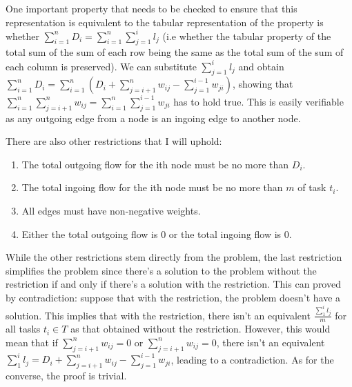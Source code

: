 \documentclass[11pt]{article}
\begin{document}
One important property that needs to be checked to ensure that this representation is equivalent to the tabular representation of the property is whether $\sum_{i = 1}^{n}{D_i} = \sum_{i = 1}^{n}{\sum_{j = 1}^{i}{l_j}}$ (i.e whether the tabular property of the total sum of the sum of each row being the same as the total sum of the sum of each column is preserved).
We can substitute $\sum_{j=1}^{i}{l_j}$ and obtain  $\sum_{i = 1}^{n}{D_i} = \sum_{i = 1}^{n}{(D_i + \sum_{j = i + 1}^{n}{w_{ij}} - \sum_{j = 1}^{i - 1}{w_{ji}})}$, showing that  $ \sum_{i = 1}^{n}{\sum_{j = i + 1}^{n}{w_{ij}}} =  \sum_{i = 1}^{n}{\sum_{j = 1}^{i - 1}{w_{ji}}}$ has to hold true. This is easily verifiable as any outgoing edge from a node is an ingoing edge to another node.  
\begin{center}
\end{center}
There are also other restrictions that I will uphold:
 \begin{enumerate}
	\item The total outgoing flow for the ith node must be no more than $D_i$.
	\item The total ingoing flow for the ith node must be no more than $m$ of task $t_i$.
	\item All edges must have non-negative weights.
	 \item Either the total outgoing flow is 0 or the total ingoing flow is 0.
\end{enumerate}
While the other restrictions stem directly from the problem, the last restriction simplifies the problem since there's a solution to the problem without the restriction if and only if there's a solution with the restriction. This can proved by contradiction: suppose that with the restriction, the problem doesn't have a solution. This implies that with the restriction, there isn't an equivalent $\frac{\sum_{1}^{i}{l_j}}{m}$ for all tasks $t_i \in T$ as that obtained without the restriction. However, this would mean that if $\sum_{j = i + 1}^{n}{w_{ij}} = 0$ or $\sum_{j = i + 1}^{n}{w_{ij}} = 0$, there isn't an equivalent $\sum_{1}^{i}{l_j} =  D_i + \sum_{j = i + 1}^{n}{w_{ij}} - \sum_{j = 1}^{i - 1}{w_{ji}}$, leading to a contradiction. As for the converse, the proof is trivial.
\end{document}
